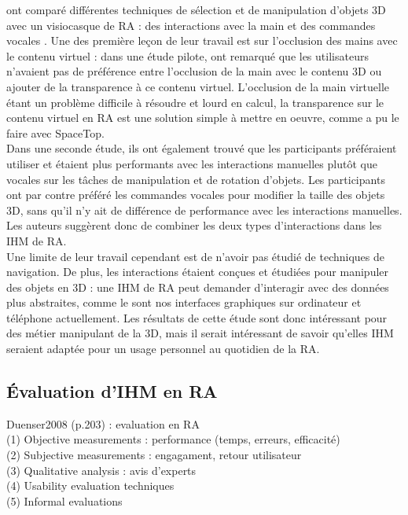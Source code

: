 \cite{Piumsomboon2014} ont comparé différentes techniques de sélection et de manipulation d'objets 3D avec un visiocasque de RA : des interactions avec la main et des commandes vocales . Une des première leçon de leur travail est sur l'occlusion des mains avec le contenu virtuel : dans une étude pilote, \citeauthor{Piumsomboon2014} ont remarqué que les utilisateurs n'avaient pas de préférence entre l'occlusion de la main avec le contenu 3D ou ajouter de la transparence à ce contenu virtuel. L'occlusion de la main virtuelle étant un problème difficile à résoudre et lourd en calcul, la transparence sur le contenu virtuel en RA est une solution simple à mettre en oeuvre, comme a pu le faire \cite{Lee2013} avec SpaceTop.\\
Dans une seconde étude, ils ont également trouvé que les participants préféraient utiliser et étaient plus performants avec les interactions manuelles plutôt que vocales sur les tâches de manipulation et de rotation d'objets. Les participants ont par contre préféré les commandes vocales pour modifier la taille des objets 3D, sans qu'il n'y ait de différence de performance avec les interactions manuelles. Les auteurs suggèrent donc de combiner les deux types d'interactions dans les IHM de RA.\\
Une limite de leur travail cependant est de n'avoir pas étudié de techniques de navigation. De plus, les interactions étaient conçues et étudiées pour manipuler des objets en 3D : une IHM de RA peut demander d'interagir avec des données plus abstraites, comme le sont nos interfaces graphiques sur ordinateur et téléphone actuellement. Les résultats de cette étude sont donc intéressant pour des métier manipulant de la 3D, mais il serait intéressant de savoir qu'elles IHM seraient adaptée pour un usage personnel au quotidien de la RA.


\subsection{Évaluation d'IHM en RA}
Duenser2008 (p.203) : evaluation en RA\\
(1) Objective measurements : performance (temps, erreurs, efficacité)\\
(2) Subjective measurements : engagament, retour utilisateur\\
(3) Qualitative analysis : avis d'experts\\
(4) Usability evaluation techniques\\
(5) Informal evaluations


